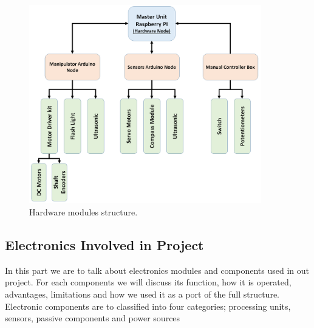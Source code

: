 \documentclass[12pt]{article}
\begin{document}
\begin{itemize}
	\begin{figure}[H]
		\centering
		\includegraphics[width =0.9\textwidth]{Fig/hardware-structure.png}
		\caption{Hardware modules structure.}
		\label{fig:harware-structure}
	\end{figure}

	
\end{itemize}

\subsection{Electronics Involved in Project}
In this part we are to talk about electronics modules and components used in out project. For each components we will discuss its function, how it is operated, advantages, limitations and how we used it as a port of the full structure. Electronic components are to classified into four categories; processing units, sensors, passive components and power sources
\end{document}
